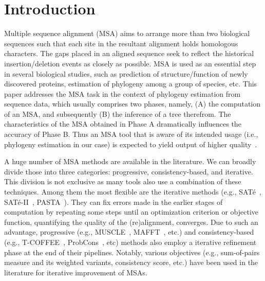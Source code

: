 \documentclass[a4paper,fleqn, review]{cas-dc}
\begin{document}
\section{Introduction}
\label{sec:intro}
Multiple sequence alignment (MSA) aims to arrange more than two biological sequences such that each site in the resultant alignment holds homologous characters. The gaps placed in an aligned sequence seek to reflect the historical insertion/deletion events as closely as possible. MSA is used as an essential step in several biological studies, such as prediction of structure/function of newly discovered proteins, estimation of phylogeny among a group of species, etc. This paper addresses the MSA task in the context of phylogeny estimation from sequence data, which usually comprises two phases, namely, (A) the computation of an MSA, and subsequently (B) the inference of a tree therefrom. The characteristics of the MSA obtained in Phase A dramatically influences the accuracy of Phase B. Thus an MSA tool that is aware of its intended usage (i.e., phylogeny estimation in our case) is expected to yield output of higher quality~\cite{nayeem2020multiobjective, nayeem2019phylogeny}.  

A huge number of MSA methods are available in the literature. We can broadly divide those into three categories: progressive, consistency-based, and iterative. This division is not exclusive as many tools also use a combination of these techniques. Among them the most flexible are the iterative methods (e.g., SAT\'e~\cite{liu2009rapid}, SAT\'e-II~\cite{liu2012sate}, PASTA~\cite{mirarab2015pasta}). They can fix errors made in the earlier stages of computation by repeating some steps until an optimization criterion or objective function, quantifying the quality of the (re)alignment, converges. Due to such an advantage, progressive (e.g., MUSCLE~\cite{edgar2004muscle}, MAFFT~\cite{katoh2002mafft}, etc.) and consistency-based (e.g., T-COFFEE~\cite{notredame2000t}, ProbCons~\cite{do2005probcons}, etc) methods also employ a iterative refinement phase at the end of their pipelines. Notably, various objectives (e.g., sum-of-pairs measure and its weighted variants, consistency score, etc.) have been used in the literature for iterative improvement of MSAs. 
\end{document}
